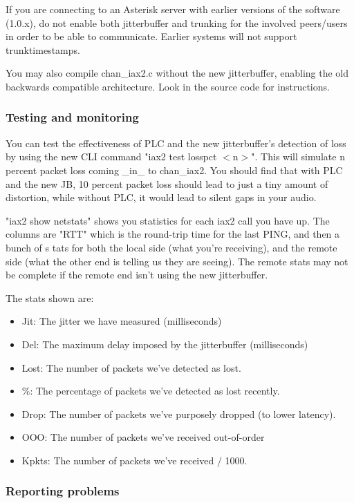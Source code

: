 If you are connecting to an Asterisk server with earlier versions of the software (1.0.x),
do not enable both jitterbuffer and trunking for the involved peers/users
in order to be able  to communicate. Earlier systems will not support trunktimestamps.

You may also compile chan\_iax2.c without the new jitterbuffer, enabling the old
backwards compatible architecture. Look in the source code for instructions.


\subsubsection{Testing and monitoring}

You can test the effectiveness of PLC and the new jitterbuffer's detection of loss by using
the new CLI command "iax2 test losspct $<$n$>$".  This will simulate n percent packet loss
coming \_in\_ to chan\_iax2. You should find that with PLC and the new JB, 10 percent packet
loss should lead to just a tiny amount of distortion, while without PLC, it would lead to
silent gaps in your audio.

"iax2 show netstats" shows you statistics for each iax2 call you have up.
The columns are "RTT" which is the round-trip time for the last PING, and then a bunch of s
tats for both the local side (what you're receiving), and the remote side (what the other
end is telling us they are seeing).  The remote stats may not be complete if the remote
end isn't using the new jitterbuffer.

The stats shown are:
\begin{itemize}
\item Jit: The jitter we have measured (milliseconds)
\item Del: The maximum delay imposed by the jitterbuffer (milliseconds)
\item Lost: The number of packets we've detected as lost.
\item \%: The percentage of packets we've detected as lost recently.
\item Drop: The number of packets we've purposely dropped (to lower latency).
\item OOO: The number of packets we've received out-of-order
\item Kpkts: The number of packets we've received / 1000.
\end{itemize}

\subsubsection{Reporting problems}

